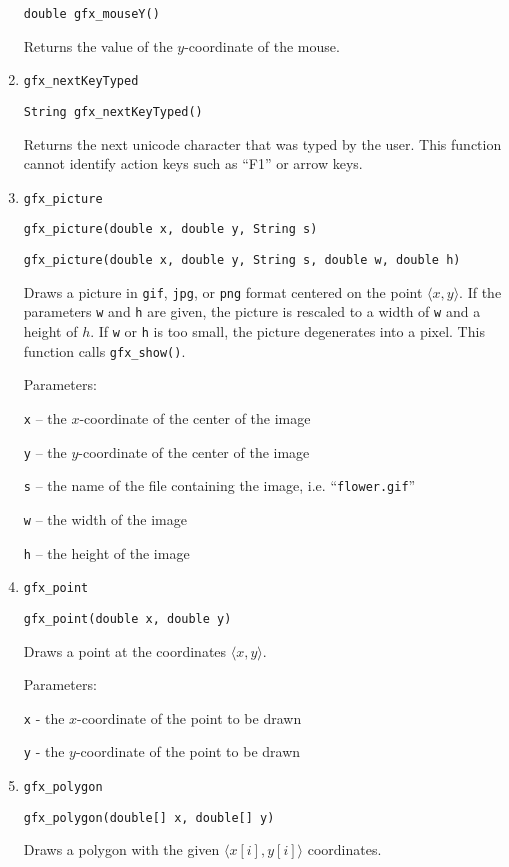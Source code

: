 \begin{enumerate}
      \texttt{double gfx\_mouseY()}

      Returns the value of the $y$-coordinate of the mouse.
\item \texttt{gfx\_nextKeyTyped}

      \texttt{String gfx\_nextKeyTyped()}

      Returns the next unicode character that was typed by the user. This function cannot
      identify action keys such as ``F1'' or arrow keys.
\item \texttt{gfx\_picture}

      \texttt{gfx\_picture(double x, double y, String s)}

      \texttt{gfx\_picture(double x, double y, String s, double w, double h)}

      Draws a picture in \texttt{gif}, \texttt{jpg}, or \texttt{png} format centered 
      on the point $\langle x, y \rangle$.  If the parameters \texttt{w} and \texttt{h}
      are given, the picture is rescaled to a width of \texttt{w} and a height of $h$. 
      If \texttt{w} or \texttt{h} is too small, the picture degenerates into a pixel. 
      This function calls \texttt{gfx\_show()}.

      Parameters:

      \texttt{x} -- the $x$-coordinate of the  center  of the image 

      \texttt{y} -- the $y$-coordinate of the  center  of the image 

      \texttt{s} -- the name of the file containing the image, i.e. ``\texttt{flower.gif}'' 

      \texttt{w} -- the width of the image 
      
      \texttt{h} -- the height of the image
\item \texttt{gfx\_point}

      \texttt{gfx\_point(double x, double y)}

      Draws a point at the coordinates $\langle x, y \rangle$.
      
      Parameters:

      \texttt{x} - the $x$-coordinate of the point to be drawn

      \texttt{y} - the $y$-coordinate of the point to be drawn
\item \texttt{gfx\_polygon}

      \texttt{gfx\_polygon(double[] x, double[] y)}

      Draws a polygon with the given $\langle x[i], y[i]\rangle$ coordinates.


\end{enumerate}
